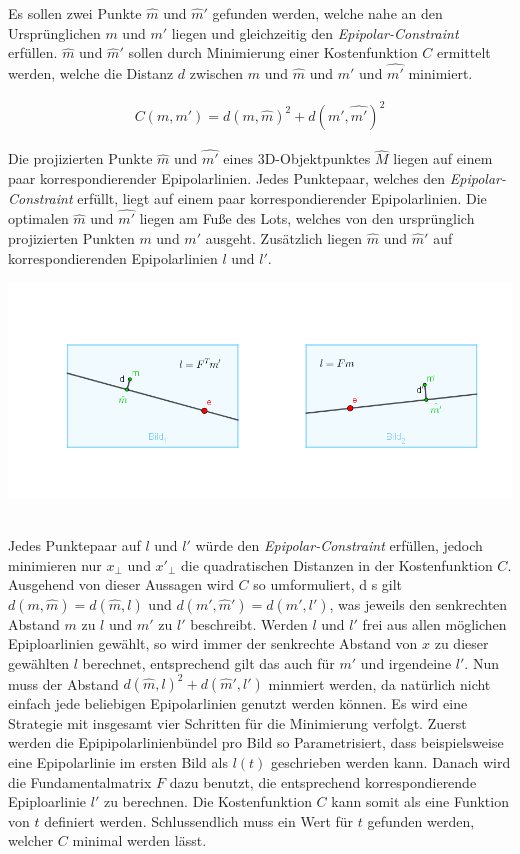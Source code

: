 Es sollen zwei Punkte $\hat{m}$ und $\hat{m}'$ gefunden werden, welche nahe an den Ursprünglichen $m$ und $m'$ liegen und gleichzeitig den \textit{Epipolar-Constraint} erfüllen. $\hat{m}$ und $\hat{m}'$ sollen durch Minimierung einer Kostenfunktion $C$ ermittelt werden, welche die Distanz  $d$ zwischen $m$ und $\hat{m}$ und $m'$ und $\hat{m'}$ minimiert.


\begin{gather}
	C(m,m') = d(m,\hat{m})^2 + d(m',\hat{m'})^2
\end{gather}

Die projizierten Punkte $\hat{m}$ und $\hat{m'}$ eines 3D-Objektpunktes $\hat{M}$ liegen auf einem paar korrespondierender Epipolarlinien. Jedes Punktepaar, welches den \textit{Epipolar-Constraint} erfüllt, liegt auf einem paar korrespondierender Epipolarlinien. Die optimalen $\hat{m}$ und $\hat{m'}$ liegen am Fuße des Lots, welches von den ursprünglich projizierten Punkten $m$ und $m'$ ausgeht. Zusätzlich liegen $\hat{m}$ und $\hat{m}'$ auf korrespondierenden Epipolarlinien $l$ und $l'$\cite{HZ}. 

\begin{minipage}{\linewidth}
	\centering
	\includegraphics[width=.8\linewidth]{images/SampsAppxNewPoints.png}
\end{minipage}\\

Jedes Punktepaar auf $l$ und $l'$ würde den \textit{Epipolar-Constraint} erfüllen, jedoch minimieren nur $x_\bot$ und $x'_\bot$ die quadratischen Distanzen in der Kostenfunktion $C$. Ausgehend von dieser Aussagen wird $C$ so umformuliert, d s gilt $d(m,\hat{m}) = d(\hat{m},l)$ und  $d(m',\hat{m}') = d(\hat{m}',l')$, was jeweils den senkrechten Abstand $m$ zu $l$ und $m'$ zu $l'$ beschreibt. Werden $l$ und $l'$ frei aus allen möglichen Epiploarlinien gewählt, so wird immer der senkrechte Abstand von $x$ zu dieser gewählten $l$ berechnet, entsprechend gilt das auch für $m'$ und irgendeine $l'$. Nun muss der Abstand $d(\hat{m},l)^2+ d(\hat{m}',l')$ minmiert werden, da natürlich nicht einfach jede beliebigen Epipolarlinien genutzt werden können. Es wird eine Strategie mit insgesamt vier Schritten für die Minimierung verfolgt\cite{HZ}. Zuerst werden die Epipipolarlinienbündel pro Bild so Parametrisiert, dass beispielsweise eine Epipolarlinie im ersten Bild als $l(t)$ geschrieben werden kann. Danach wird die Fundamentalmatrix $F$ dazu benutzt, die entsprechend korrespondierende Epiploarlinie $l'$ zu berechnen. Die Kostenfunktion $C$ kann somit als eine Funktion von $t$ definiert werden. Schlussendlich muss ein Wert für $t$ gefunden werden, welcher $C$ minimal werden lässt. 

